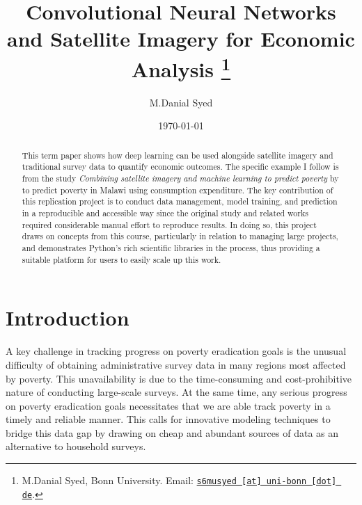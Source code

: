 \documentclass[11pt, a4paper, leqno]{article}
\begin{document}
\title{Convolutional Neural Networks and Satellite Imagery for Economic Analysis \thanks{M.Danial Syed, Bonn University. Email: \href{mailto:s6musyed@uni-bonn.de}{\nolinkurl{s6musyed [at] uni-bonn [dot] de}}.}}

\author{M.Danial Syed}

\date{
    \today
}

\maketitle


\begin{abstract}
 This term paper shows how deep learning can be used alongside satellite imagery and traditional survey data to quantify economic outcomes. The specific example I follow is from the study \textit{Combining satellite imagery and machine learning to predict poverty} by \citet{jean2016combining} to predict poverty in Malawi using consumption expenditure. The key contribution of this replication project is to conduct data management, model training, and prediction in a reproducible and accessible way since the original study and related works required considerable manual effort to reproduce results. In doing so, this project draws on concepts from this course, particularly in relation to managing large projects, and demonstrates Python's rich scientific libraries in the process, thus providing a suitable platform for users to easily scale up this work.
\end{abstract}

\clearpage


\section{Introduction} %
\label{sec:introduction}

A key challenge in tracking progress on poverty eradication goals is the unusual difficulty of obtaining administrative survey data in many regions most affected by poverty. This unavailability is due to the time-consuming and cost-prohibitive nature of conducting large-scale surveys. At the same time, any serious progress on poverty eradication goals necessitates that we are able track poverty in a timely and reliable manner. This calls for innovative modeling techniques to bridge this data gap by drawing on cheap and abundant sources of data as an alternative to household surveys.
\end{document}
